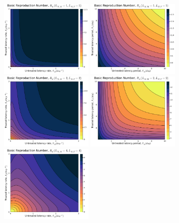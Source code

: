 \documentclass[12pt]{article}
\begin{document}
\begin{figure}[H]
    \centering
    \includegraphics[width=0.4\textwidth]{../../fig/gen_model/R0_rates_SMxST_1x1.pdf}
    \includegraphics[width=0.4\textwidth]{../../fig/gen_model/R0_periods_SMxST_1x1.pdf}\\
    \includegraphics[width=0.4\textwidth]{../../fig/gen_model/R0_rates_SMxST_2x2.pdf}
    \includegraphics[width=0.4\textwidth]{../../fig/gen_model/R0_periods_SMxST_2x2.pdf}\\
    \includegraphics[width=0.4\textwidth]{../../fig/gen_model/R0_rates_SMxST_4x4.pdf}

\end{figure}
\end{document}
